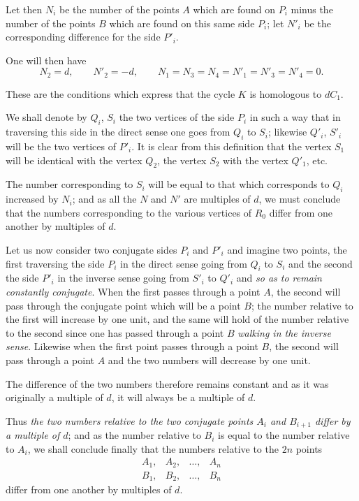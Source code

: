\documentclass{article}
\begin{document}
Let then $N_{i}$ be the number of the points $A$ which are found on $P_{i}$ minus the number of the points $B$ which are found on this same side $P_{i}$; let $N'_{i}$ be the corresponding difference for the side $P'_{i}$.

One will then have
\[ N_{2} = d, \qquad N'_{2} = -d, \qquad N_{1} = N_{3} = N_{4} = N'_{1} = N'_{3} = N'_{4} = 0. \]

These are the conditions which express that the cycle $K$ is homologous to $dC_{1}$.

We shall denote by $Q_{i}$, $S_{i}$ the two vertices of the side $P_{i}$ in such a way that in traversing this side in the direct sense one goes from $Q_{i}$ to $S_{i}$; likewise $Q'_{i}$, $S'_{i}$ will be the two vertices of $P'_{i}$. It is clear from this definition that the vertex $S_{1}$ will be identical with the vertex $Q_{2}$, the vertex $S_{2}$ with the vertex $Q'_{1}$, etc.

The number corresponding to $S_{i}$ will be equal to that which corresponds to $Q_{i}$ increased by $N_{i}$; and as all the $N$ and $N'$ are multiples of $d$, we must conclude that the numbers corresponding to the various vertices of $R_{0}$ differ from one another by multiples of $d$.

Let us now consider two conjugate sides $P_{i}$ and $P'_{i}$ and imagine two points, the first traversing the side $P_{i}$ in the direct sense going from $Q_{i}$ to $S_{i}$ and the second the side $P'_{i}$ in the inverse sense going from $S'_{i}$ to $Q'_{i}$ and \emph{so as to remain constantly conjugate}. When the first passes through a point $A$, the second will pass through the conjugate point which will be a point $B$; the number relative to the first will increase by one unit, and the same will hold of the number relative to the second since one has passed through a point $B$ \emph{walking in the inverse sense}. Likewise when the first point passes through a point $B$, the second will pass through a point $A$ and the two numbers will decrease by one unit.


The difference of the two numbers therefore remains constant and as it was originally a multiple of $d$, it will always be a multiple of $d$.

Thus \emph{the two numbers relative to the two conjugate points $A_{i}$ and $B_{i+1}$ differ by a multiple of $d$}; and as the number relative to $B_{i}$ is equal to the number relative to $A_{i}$, we shall conclude finally that the numbers relative to the $2n$ points
\[ \begin{matrix} A_{1}, & A_{2}, & \ldots, & A_{n} \\[1ex] B_{1}, & B_{2}, & \ldots, & B_{n} \end{matrix} \]
differ from one another by multiples of $d$.
\end{document}
